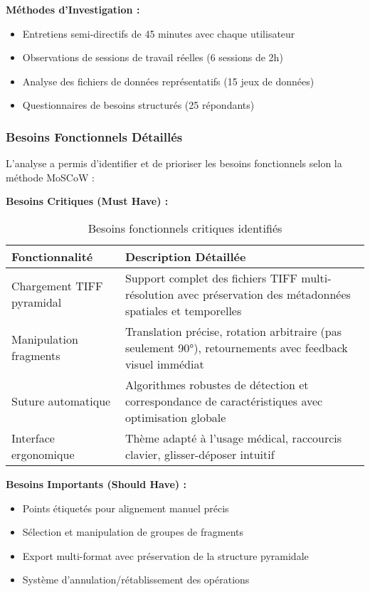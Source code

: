 \documentclass[12pt,a4paper]{article}
\begin{document}
\textbf{Méthodes d'Investigation :}
\begin{itemize}
\item Entretiens semi-directifs de 45 minutes avec chaque utilisateur
\item Observations de sessions de travail réelles (6 sessions de 2h)
\item Analyse des fichiers de données représentatifs (15 jeux de données)
\item Questionnaires de besoins structurés (25 répondants)
\end{itemize}

\subsubsection{Besoins Fonctionnels Détaillés}

L'analyse a permis d'identifier et de prioriser les besoins fonctionnels selon la méthode MoSCoW :

\textbf{Besoins Critiques (Must Have) :}

\begin{table}[h]
\centering
\begin{tabular}{|p{4cm}|p{7cm}|}
\hline
\textbf{Fonctionnalité} & \textbf{Description Détaillée} \\
\hline
Chargement TIFF pyramidal & Support complet des fichiers TIFF multi-résolution avec préservation des métadonnées spatiales et temporelles \\
\hline
Manipulation fragments & Translation précise, rotation arbitraire (pas seulement 90°), retournements avec feedback visuel immédiat \\
\hline
Suture automatique & Algorithmes robustes de détection et correspondance de caractéristiques avec optimisation globale \\
\hline
Interface ergonomique & Thème adapté à l'usage médical, raccourcis clavier, glisser-déposer intuitif \\
\hline
\end{tabular}
\caption{Besoins fonctionnels critiques identifiés}
\end{table}

\textbf{Besoins Importants (Should Have) :}
\begin{itemize}
\item Points étiquetés pour alignement manuel précis
\item Sélection et manipulation de groupes de fragments
\item Export multi-format avec préservation de la structure pyramidale
\item Système d'annulation/rétablissement des opérations
\end{itemize}
\end{document}

